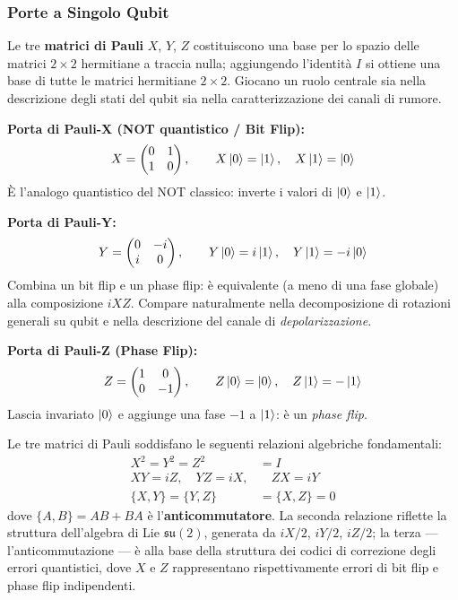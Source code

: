 \begin{onehalfspace}
\subsubsection{Porte a Singolo Qubit}

Le tre \textbf{matrici di Pauli} $X$, $Y$, $Z$ costituiscono una base per lo spazio delle matrici $2\times 2$ hermitiane a traccia nulla; aggiungendo l'identità $I$ si ottiene una base di tutte le matrici hermitiane $2\times 2$. Giocano un ruolo centrale sia nella descrizione degli stati del qubit sia nella caratterizzazione dei canali di rumore.

\textbf{Porta di Pauli-X (NOT quantistico / Bit Flip):}
\begin{equation}
    X = \begin{pmatrix} 0 & 1 \\ 1 & 0 \end{pmatrix}, \qquad X\ket{0} = \ket{1}, \quad X\ket{1} = \ket{0}
\end{equation}
È l'analogo quantistico del NOT classico: inverte i valori di $\ket{0}$ e $\ket{1}$.

\textbf{Porta di Pauli-Y:}
\begin{equation}
    Y = \begin{pmatrix} 0 & -i \\ i & 0 \end{pmatrix}, \qquad Y\ket{0} = i\ket{1}, \quad Y\ket{1} = -i\ket{0}
\end{equation}
Combina un bit flip e un phase flip: è equivalente (a meno di una fase globale) alla composizione $iXZ$. Compare naturalmente nella decomposizione di rotazioni generali su qubit e nella descrizione del canale di \textit{depolarizzazione}.

\textbf{Porta di Pauli-Z (Phase Flip):}
\begin{equation}
    Z = \begin{pmatrix} 1 & 0 \\ 0 & -1 \end{pmatrix}, \qquad Z\ket{0} = \ket{0}, \quad Z\ket{1} = -\ket{1}
\end{equation}
Lascia invariato $\ket{0}$ e aggiunge una fase $-1$ a $\ket{1}$: è un \textit{phase flip}.

Le tre matrici di Pauli soddisfano le seguenti relazioni algebriche fondamentali:
\begin{align}
    X^2 = Y^2 = Z^2 &= I \\
    XY = iZ, \quad YZ = iX, &\quad ZX = iY \\
    \{X, Y\} = \{Y, Z\} &= \{X, Z\} = 0
\end{align}
dove $\{A, B\} = AB + BA$ è l'\textbf{anticommutatore}. La seconda relazione riflette la struttura dell'algebra di Lie $\mathfrak{su}(2)$, generata da $iX/2$, $iY/2$, $iZ/2$; la terza --- l'anticommutazione --- è alla base della struttura dei codici di correzione degli errori quantistici, dove $X$ e $Z$ rappresentano rispettivamente errori di bit flip e phase flip indipendenti.


\end{onehalfspace}
